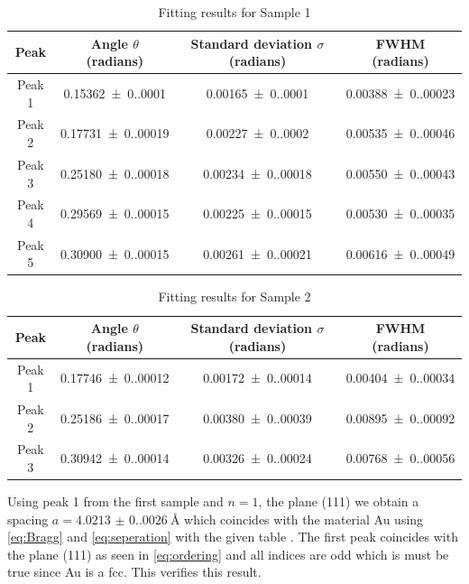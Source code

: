 \begin{table}[H]
    \centering
    \caption{Fitting results for Sample 1}
    \begin{tabular}{cccc}
    \toprule
    Peak & Angle $\theta$ (radians) & Standard deviation $\sigma$ (radians) & FWHM (radians) \\
    \midrule
    Peak 1 & \num{0.15362(0.00010)}{} & \num{0.00165(0.00010)} & \num{0.00388(0.00023)}{} \\
    Peak 2 & \num{0.17731(0.00019)}{} & \num{0.00227(0.00020)}{} & \num{0.00535(0.00046)}{} \\
    Peak 3 & \num{0.25180(0.00018)}{} & \num{0.00234(0.00018)}{} & \num{0.00550(0.00043)}{} \\
    Peak 4 & \num{0.29569(0.00015)}{} & \num{0.00225(0.00015)}{} & \num{0.00530(0.00035)}{} \\
    Peak 5 & \num{0.30900(0.00015)}{} & \num{0.00261(0.00021)}{} & \num{0.00616(0.00049)}{} \\
    \bottomrule
    \end{tabular}
    \label{tab:sample1}
\end{table}

\begin{table}[H]
    \centering
    \caption{Fitting results for Sample 2}
    \begin{tabular}{cccc}
    \toprule
    Peak & Angle $\theta$ (radians) & Standard deviation $\sigma$ (radians) & FWHM (radians) \\
    \midrule
    Peak 1 & \num{0.17746(0.00012)}{} & \num{0.00172(0.00014)}{} & \num{0.00404(0.00034)}{} \\
    Peak 2 & \num{0.25186(0.00017)}{} & \num{0.00380(0.00039)}{} & \num{0.00895(0.00092)}{} \\
    Peak 3 & \num{0.30942(0.00014)}{} & \num{0.00326(0.00024)}{} & \num{0.00768(0.00056)}{} \\
    \bottomrule
    \end{tabular}
    \label{tab:sample2}
\end{table}

Using peak 1 from the first sample and $n=1$, the plane (111) we obtain a spacing $a=\SI{4.0213(0.0026)}{\angstrom}$ which coincides with the material Au using \autoref{eq:Bragg} and \autoref{eq:seperation} with the given table \cite{solidstatephysics2025}. The first peak coincides with the plane (111) as seen in \autoref{eq:ordering} and all indices are odd which is must be true since Au is a fcc. This verifies this result. 

